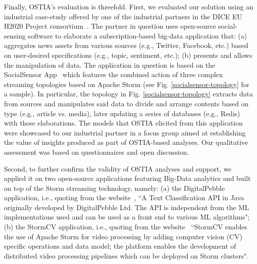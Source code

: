 Finally, OSTIA's evaluation is threefold.  First, we evaluated our solution
using an industrial case-study offered by one of the industrial partners in the
DICE EU H2020 Project consortium~\cite{dice2020}.
The
partner in question uses open-source social-sensing software to elaborate a
subscription-based big-data application that: (a) aggregates news assets from
various sources (e.g., Twitter, Facebook, etc.) based on user-desired
specifications (e.g., topic, sentiment, etc.); (b) presents and allows the
manipulation of data. The application in question is based on the SocialSensor
App~\cite{socialsensor}
which features the combined
action of three complex streaming topologies based on Apache Storm (see
Fig. \ref{socialsensor-topology} for a sample).  In particular, the topology in
Fig. \ref{socialsensor-topology} extracts data from sources and manipulates said
data to divide and arrange contents based on type (e.g., article vs. media),
later updating a series of databases (e.g., Redis) with these elaborations. The
models that OSTIA elicited from this application were showcased to our
industrial partner in a focus group aimed at establishing the value of insights
produced as part of OSTIA-based analyses. Our qualitative assessment was based
on questionnaires and open discussion.

Second, to further confirm the validity of OSTIA analyses and support, we
applied it on two open-source applications featuring Big-Data analytics and
built on top of the Storm streaming technology, namely: (a) the DigitalPebble
application, i.e., quoting from the
website~\cite{storm-crawler},
``A Text Classification API in Java originally developed by DigitalPebble Ltd. The
API is independent from the ML implementations used and can be used as a front
end to various ML algorithms"; (b) the StormCV application, i.e., quoting from
the website~\cite{stormCV}
``StormCV
enables the use of Apache Storm for video processing by adding computer vision
(CV) specific operations and data model; the platform enables the development of
distributed video processing pipelines which can be deployed on Storm clusters".


